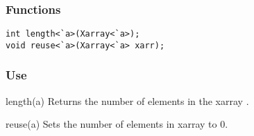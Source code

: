 \subsubsection*{Functions}
\begin{verbatim}
int length<`a>(Xarray<`a>);
void reuse<`a>(Xarray<`a> xarr);
\end{verbatim}

\subsubsection*{Use}

\begin{defun}{length}{(a)}
Returns the number of elements in the xarray .
\end{defun}

\begin{defun}{reuse}{(a)}
Sets the number of elements in xarray  to 0.
\end{defun}

